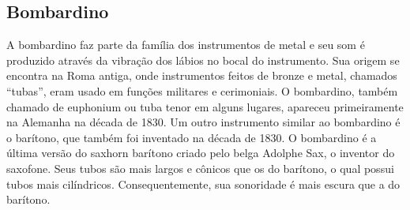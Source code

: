 \subsection*{Bombardino}

A bombardino faz parte da família dos instrumentos de metal
e seu som é produzido através da vibração dos lábios no bocal do
instrumento. Sua origem se encontra na Roma antiga, onde instrumentos
feitos de bronze e metal, chamados ``tubas'', eram usado em funções
militares e cerimoniais. O bombardino, também chamado de euphonium ou
tuba tenor em alguns lugares, apareceu primeiramente na Alemanha na
década de 1830. Um outro instrumento similar ao bombardino é o
barítono, que também foi inventado na década de 1830. O bombardino é a
última versão do saxhorn barítono criado pelo belga Adolphe Sax, o
inventor do saxofone. Seus tubos são mais largos e cônicos que os do
barítono, o qual possui tubos mais cilíndricos. Consequentemente, sua
sonoridade é mais escura que a do barítono.